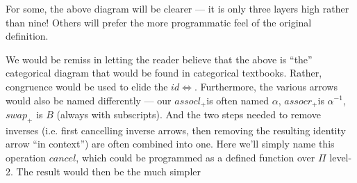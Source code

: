 \documentclass{article}
\newcommand{\swapp}{\ensuremath{\mathit{swap}_+}}
\newcommand{\assoclp}{\ensuremath{\mathit{assocl}_+}}
\newcommand{\assocrp}{\ensuremath{\mathit{assocr}_+}}
\begin{document}
\newcommand{\idd}{\mathit{id}\leftrightarrow}
\newcommand{\idf}{\mathit{id}\Leftrightarrow}
\vspace*{3mm}

\noindent For some, the above diagram will be clearer --- it is only three layers
high rather than nine! Others will prefer the more programmatic feel of the
original definition.

We would be remiss in letting the reader believe that the above is ``the''
categorical diagram that would be found in categorical textbooks. Rather,
congruence would be used to elide the $\idf$. Furthermore, the various arrows
would also be named differently --- our \assoclp is often named $\alpha$,
\assocrp is $\alpha^{-1}$, $\swapp$ is $B$ (always with subscripts).
And the two steps needed to remove inverses (i.e. first cancelling
inverse arrows, then removing the resulting identity arrow ``in context'')
are often combined into one. Here we'll simply name this operation 
$\mathit{cancel}$, which could be programmed as a defined function over
$\Pi$ level-2.  The result would then be the much simpler
\end{document}
